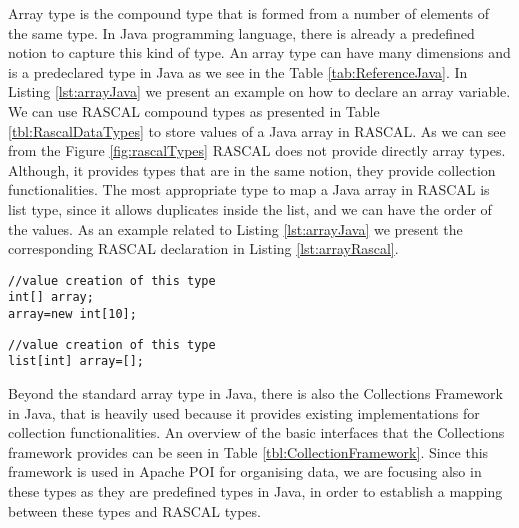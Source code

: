 Array type is the compound type that is formed from a number of elements of the same type. In Java programming language, there is already a predefined notion to capture this kind of type. An array type can have many dimensions and is a predeclared type in Java as we see in the Table \ref{tab:ReferenceJava}. In Listing \ref{lst:arrayJava} we present an example on how to declare an array variable. We can use RASCAL compound types as presented in Table \ref{tbl:RascalDataTypes} to store values of a Java array in RASCAL. As we can see from the Figure \ref{fig:rascalTypes} RASCAL does not provide directly array types. Although, it provides types that are in the same notion, they provide collection functionalities. The most appropriate type to map a Java array in RASCAL is list type, since it allows duplicates inside the list, and we can have the order of the values. As an example related to Listing \ref{lst:arrayJava} we present the corresponding RASCAL declaration in Listing \ref{lst:arrayRascal}.



\begin{lstlisting}[label=lst:arrayJava,caption=Declaration example of an Array type in Java.]
//value creation of this type
int[] array;
array=new int[10];
\end{lstlisting}

\begin{lstlisting}[label=lst:arrayRascal,caption=Mapping example of an Array Type in RASCAL.]
//value creation of this type
list[int] array=[];
\end{lstlisting}


Beyond the standard array type in Java, there is also the Collections Framework in Java\cite{collections}, that is heavily used because it provides existing implementations for collection functionalities. An overview of the basic interfaces that the Collections framework provides can be seen in Table \ref{tbl:CollectionFramework}. Since this framework is used in Apache POI for organising data, we are focusing also in these types as they are predefined types in Java, in order to establish a mapping between these types and RASCAL types.
 
